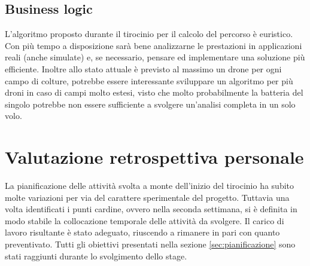 \subsection{Business logic}
L'algoritmo proposto durante il tirocinio per il calcolo del percorso è euristico. Con più tempo a disposizione sarà bene analizzarne le prestazioni in applicazioni reali (anche simulate) e, se necessario, pensare ed implementare una soluzione più efficiente. Inoltre allo stato attuale è previsto al massimo un drone per ogni campo di colture, potrebbe essere interessante sviluppare un algoritmo per più droni in caso di campi molto estesi, visto che molto probabilmente la batteria del singolo potrebbe non essere sufficiente a svolgere un'analisi completa in un solo volo.

\section{Valutazione retrospettiva personale}
La pianificazione delle attività svolta a monte dell'inizio del tirocinio ha subito molte variazioni per via del carattere sperimentale del progetto. Tuttavia una volta identificati i punti cardine, ovvero nella seconda settimana, si è definita in modo stabile la collocazione temporale delle attività da svolgere. Il carico di lavoro risultante è stato adeguato, riuscendo a rimanere in pari con quanto preventivato. Tutti gli obiettivi presentati nella sezione \ref{sec:pianificazione} sono stati raggiunti durante lo svolgimento dello stage.